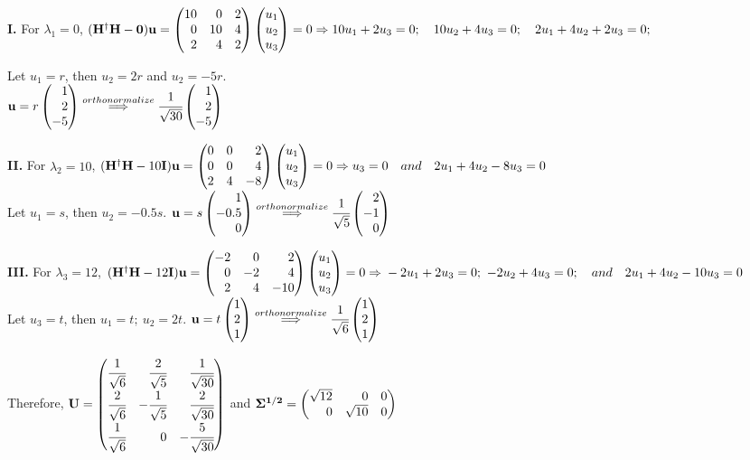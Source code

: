 \documentclass[12pt,a4paper]{article}
\begin{document}
    \noindent \textbf{I.} For $\lambda_1=0$, $\mathbf{(H^\dagger H-0)u}=\newvec{10&0&2\\0&10&4\\2&4&2}\newvec{u_1\\u_2\\u_3}=0\Rightarrow \\
    10u_1+2u_3=0;\quad 10u_2+4u_3=0;\quad 2u_1+4u_2+2u_3=0;$

    \noindent Let $u_1=r$, then $u_2=2r$ and $u_2=-5r$. \\
    $\mathbf{u}=r\newvec{1\\2\\-5}\stackrel{orthonormalize}{\Longrightarrow}\cfrac{1}{\sqrt{30}}\newvec{1\\2\\-5}$

    \noindent \textbf{II.} For $\lambda_2=10$, $\mathbf{(H^\dagger H-\textnormal{10}I)u}=\newvec{0&0&2\\0&0&4\\2&4&-8}\newvec{u_1\\u_2\\u_3}=0\Rightarrow \\
    u_3=0\quad and \quad 2u_1+4u_2-8u_3=0$\\
    Let $u_1=s$, then $u_2=-0.5s$. $\mathbf{u}=s\newvec{1\\-0.5\\0}\stackrel{orthonormalize}{\Longrightarrow}\cfrac{1}{\sqrt{5}}\newvec{2\\-1\\0}$

    \noindent \textbf{III.} For $\lambda_3=12$, $\mathbf{(H^\dagger H-\textnormal{12}I)u}=\newvec{-2&0&2\\0&-2&4\\2&4&-10}\newvec{u_1\\u_2\\u_3}=0\Rightarrow\\
    -2u_1+2u_3=0;\ -2u_2+4u_3=0;\quad and \quad 2u_1+4u_2-10u_3=0$\\
    Let $u_3=t$, then $u_1=t;\ u_2=2t$. $\mathbf{u}=t\newvec{1\\2\\1}\stackrel{orthonormalize}{\Longrightarrow}\cfrac{1}{\sqrt{6}}\newvec{1\\2\\1}$

    \noindent Therefore, $\mathbf{U}=\newvec{\sqrtfrac{1}{6}&\sqrtfrac{2}{5}&\sqrtfrac{1}{30}\\\sqrtfrac{2}{6}&-\sqrtfrac{1}{5}&\sqrtfrac{2}{30}\\\sqrtfrac{1}{6}&0&-\sqrtfrac{5}{30}}$ and $\mathbf{\Sigma^{1/2}}=\newvec{\sqrt{12}&0&0\\0&\sqrt{10}&0}$
\end{document}
